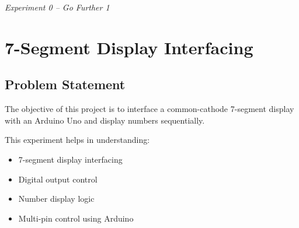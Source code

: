 \clearpage

\textit{Experiment 0 -- Go Further 1}
\section{7-Segment Display Interfacing}


\subsection{Problem Statement}

The objective of this project is to interface a common-cathode 7-segment display with an Arduino Uno and display numbers sequentially.

This experiment helps in understanding:

\begin{itemize}
    \item 7-segment display interfacing
    \item Digital output control
    \item Number display logic
    \item Multi-pin control using Arduino
\end{itemize}


